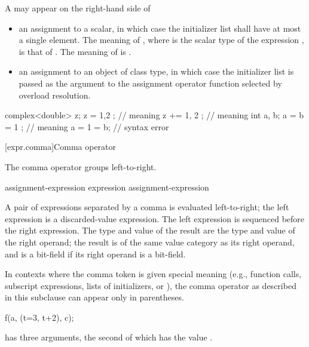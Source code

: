 \pnum
A  may appear on the right-hand side of
\begin{itemize}
\item an assignment to a scalar, in which case the initializer list shall have
at most a single element. The meaning of , where  is the
scalar type of the expression , is that of . The meaning of
 is .

\item an assignment to an object of class type, in which case the initializer
list is passed as the argument to the assignment operator function selected by
overload resolution.
\end{itemize}
\begin{example}
\begin{codeblock}
complex<double> z;
z = { 1,2 };        // meaning 
z += { 1, 2 };      // meaning 
int a, b;
a = b = { 1 };      // meaning 
a = { 1 } = b;      // syntax error
\end{codeblock}
\end{example}

[expr.comma]{Comma operator}%
%
%
%
%
%

\pnum
The comma operator groups left-to-right.

\begin{bnf}
\br
    assignment-expression\br
    expression \terminal{,} assignment-expression
\end{bnf}

A pair of expressions separated by a comma is evaluated left-to-right;
the left expression is
a discarded-value expression.
The left expression is sequenced before
the right expression.
%
The type and value of the
result are the type and value of the right operand; the result is of the same
value category as its right operand, and is a bit-field if its
right operand is a bit-field.

\pnum
\begin{note}
In contexts where the comma token is given special meaning
(e.g., function calls,
subscript expressions,
lists of initializers,
or ),
the comma operator as described in this subclause can appear only in parentheses.
\begin{example}
\begin{codeblock}
f(a, (t=3, t+2), c);
\end{codeblock}
has three arguments, the second of which has the value
.
\end{example}
\end{note}


